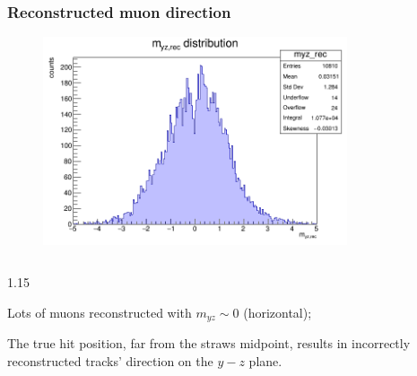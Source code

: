 \documentclass{beamer}
\begin{document}
\begin{frame}
    \frametitle{Reconstructed muon direction}
    \begin{figure}[!h]
        \centering
        \includegraphics[width =0.8\textwidth]{figures/png/myz_rec.png}
       \end{figure}
       \begin{columns}
        \begin{column}{1.15\framewidth}
            \begin{itemize}
               {\small \item Lots of muons reconstructed with $m_{yz}\sim 0$ (horizontal);
               \item The true hit position, far from the straws midpoint, 
               results in incorrectly reconstructed tracks' direction on the $y-z$ plane.
                }
            \end{itemize}
        \end{column}
        \end{columns}
\end{frame}
\end{document}
